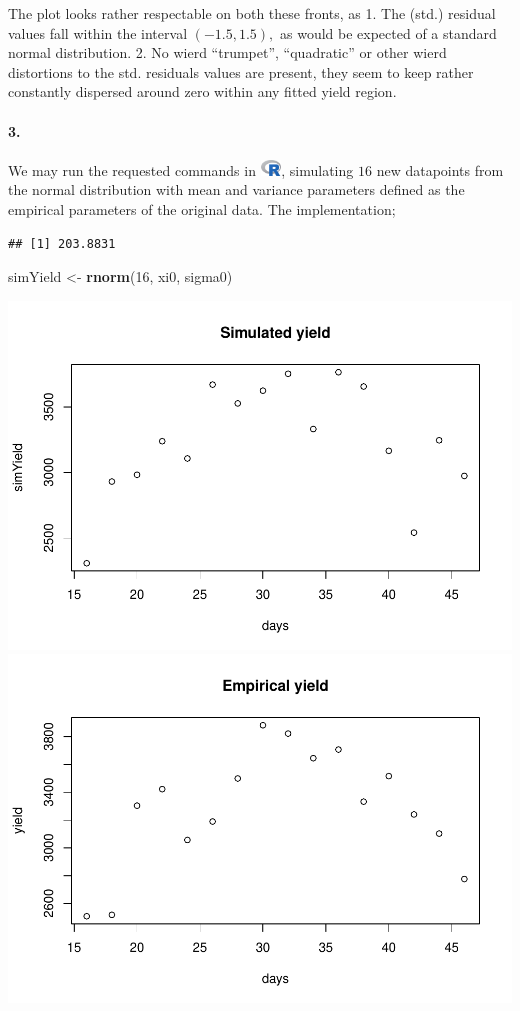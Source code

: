 \documentclass[
]{article}
\newenvironment{Shaded}{\begin{snugshade}}{\end{snugshade}}
\newcommand{\DecValTok}[1]{\textcolor[rgb]{0.00,0.00,0.81}{#1}}
\newcommand{\KeywordTok}[1]{\textcolor[rgb]{0.13,0.29,0.53}{\textbf{#1}}}
\newcommand{\NormalTok}[1]{#1}
\newcommand{\OperatorTok}[1]{\textcolor[rgb]{0.81,0.36,0.00}{\textbf{#1}}}
\newcommand{\StringTok}[1]{\textcolor[rgb]{0.31,0.60,0.02}{#1}}
\begin{document}
The plot looks rather respectable on both these fronts, as 1. The (std.)
residual values fall within the interval \(\left({-1.5,1.5}\right),\) as
would be expected of a standard normal distribution. 2. No wierd
``trumpet'', ``quadratic'' or other wierd distortions to the std.
residuals values are present, they seem to keep rather constantly
dispersed around zero within any fitted yield region.

\hypertarget{section-52}{%
\paragraph{\texorpdfstring{\textbf{3.}}{3.}}\label{section-52}}

We may run the requested commands in
\includegraphics[width=\textwidth,height=0.16667in]{R_logo.png},
simulating \(16\) new datapoints from the normal distribution with mean
and variance parameters defined as the empirical parameters of the
original data. The implementation;

\begin{Shaded}
\end{Shaded}

\begin{verbatim}
## [1] 203.8831
\end{verbatim}

\begin{Shaded}
\begin{Highlighting}[]
\NormalTok{simYield <-}\StringTok{ }\KeywordTok{rnorm}\NormalTok{(}\DecValTok{16}\NormalTok{, xi0, sigma0)}
\end{Highlighting}
\end{Shaded}

\includegraphics[width=0.5\linewidth]{matstatproblems20-21_files/figure-latex/unnamed-chunk-51-1}
\includegraphics[width=0.5\linewidth]{matstatproblems20-21_files/figure-latex/unnamed-chunk-51-2}
\end{document}
